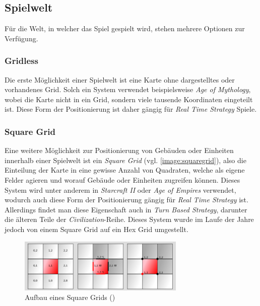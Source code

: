 \subsection{Spielwelt}
Für die Welt, in welcher das Spiel gespielt wird, stehen mehrere Optionen zur Verfügung.

\subsubsection{Gridless}
Die erste Möglichkeit einer Spielwelt ist eine Karte ohne dargestelltes oder vorhandenes Grid. Solch ein System verwendet beispielsweise \textit{Age of Mythology}, wobei die Karte nicht in ein Grid, sondern viele tausende  Koordinaten eingeteilt ist. Diese Form der Positionierung ist daher gängig für \textit{Real Time Strategy} Spiele.

\subsubsection{Square Grid}
Eine weitere Möglichkeit zur Positionierung von Gebäuden oder Einheiten innerhalb einer Spielwelt ist ein \textit{Square Grid} (vgl. \autoref{image:squaregrid}), also die Einteilung der Karte in eine gewisse Anzahl von Quadraten, welche als eigene Felder agieren und worauf Gebäude oder Einheiten zugreifen können. Dieses System wird unter anderem in \textit{Starcraft II} oder \textit{Age of Empires} verwendet, wodurch auch diese Form der Positionierung gängig für \textit{Real Time Strategy} ist. Allerdings findet man diese Eigenschaft auch in \textit{Turn Based Strategy}, darunter die älteren Teile der \textit{Civilization}-Reihe. Dieses System wurde im Laufe der Jahre jedoch von einem Square Grid auf ein Hex Grid umgestellt.

\begin{figure}
    \begin{center}
        \includegraphics[width=300px]{0.bilder/squaregrid.png}
    \end{center}
    \caption{Aufbau eines Square Grids (\cite{world:grids})} \label{image:squaregrid}
\end{figure}

